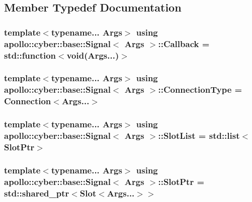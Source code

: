 \subsection{Member Typedef Documentation}
\hypertarget{classapollo_1_1cyber_1_1base_1_1Signal_a85f3c9d95bb2885c4d09cce1542ab049}{
\subsubsection[{Callback}]{\setlength{\rightskip}{0pt plus 5cm}template$<$typename... Args$>$ using {\bf apollo\-::cyber\-::base\-::\-Signal}$<$ Args $>$\-::{\bf Callback} =  std\-::function$<$void(Args...)$>$}}\label{classapollo_1_1cyber_1_1base_1_1Signal_a85f3c9d95bb2885c4d09cce1542ab049}
\hypertarget{classapollo_1_1cyber_1_1base_1_1Signal_a4fb76535f693654bd1afd5d338d85193}{
\subsubsection[{Connection\-Type}]{\setlength{\rightskip}{0pt plus 5cm}template$<$typename... Args$>$ using {\bf apollo\-::cyber\-::base\-::\-Signal}$<$ Args $>$\-::{\bf Connection\-Type} =  {\bf Connection}$<$Args...$>$}}\label{classapollo_1_1cyber_1_1base_1_1Signal_a4fb76535f693654bd1afd5d338d85193}
\hypertarget{classapollo_1_1cyber_1_1base_1_1Signal_a902c7f3a2c9bd9debeb0d7a52dc501bf}{
\subsubsection[{Slot\-List}]{\setlength{\rightskip}{0pt plus 5cm}template$<$typename... Args$>$ using {\bf apollo\-::cyber\-::base\-::\-Signal}$<$ Args $>$\-::{\bf Slot\-List} =  std\-::list$<${\bf Slot\-Ptr}$>$}}\label{classapollo_1_1cyber_1_1base_1_1Signal_a902c7f3a2c9bd9debeb0d7a52dc501bf}
\hypertarget{classapollo_1_1cyber_1_1base_1_1Signal_a3d4274b14dd47e0a5186b3c8005fe676}{
\subsubsection[{Slot\-Ptr}]{\setlength{\rightskip}{0pt plus 5cm}template$<$typename... Args$>$ using {\bf apollo\-::cyber\-::base\-::\-Signal}$<$ Args $>$\-::{\bf Slot\-Ptr} =  std\-::shared\-\_\-ptr$<${\bf Slot}$<$Args...$>$$>$}}\label{classapollo_1_1cyber_1_1base_1_1Signal_a3d4274b14dd47e0a5186b3c8005fe676}


